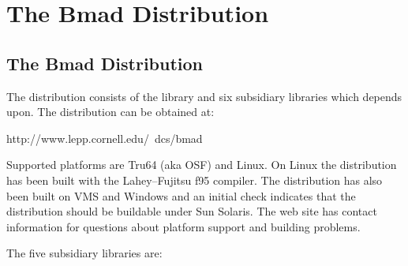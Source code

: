 \chapter{The Bmad Distribution}
\label{c:distribution}

\section {The Bmad Distribution}
\label{s:libs}

The \bmad distribution consists of the \bmad library and six subsidiary
libraries which \bmad depends upon. The \bmad distribution can be obtained at:
\begin{example}
    http://www.lepp.cornell.edu/~dcs/bmad
\end{example}
Supported platforms are Tru64 (aka OSF) and Linux. On Linux the \bmad
distribution has been built with the Lahey--Fujitsu f95 compiler. The
\bmad distribution has also been built on VMS and Windows and an
initial check indicates that the distribution should be buildable
under Sun Solaris. The \bmad web site has contact information for
questions about platform support and building problems.

The five subsidiary libraries are: 

